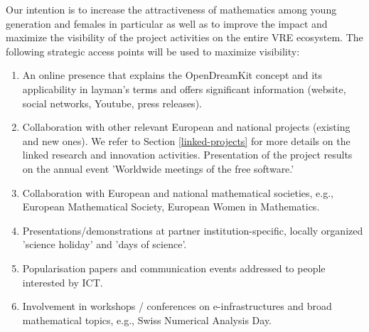 Our intention is to increase the attractiveness of mathematics among young generation and females in particular as well as to improve the impact and maximize the visibility of the project activities on the entire VRE ecosystem. The following strategic access points will be used to maximize visibility:

\begin{enumerate}
\item An online presence that explains the OpenDreamKit concept and its applicability in layman's terms and offers significant information (website, social networks, Youtube, press releases).
\item Collaboration with other relevant European and national projects (existing and new ones). We refer to Section \ref{linked-projects} for more details on the linked research and innovation activities.  Presentation of the project results on the annual event 'Worldwide meetings of the free software.' 
\item Collaboration with European and national mathematical societies, e.g., European Mathematical Society, European Women in Mathematics.
\item Presentations/demonstrations at partner institution-specific, locally organized 'science holiday' and 'days of science'.
\item Popularisation papers and communication events addressed to people interested by ICT. 
\item Involvement in workshops / conferences on e-infrastructures and broad mathematical topics, e.g., Swiss Numerical Analysis Day.
\end{enumerate}

